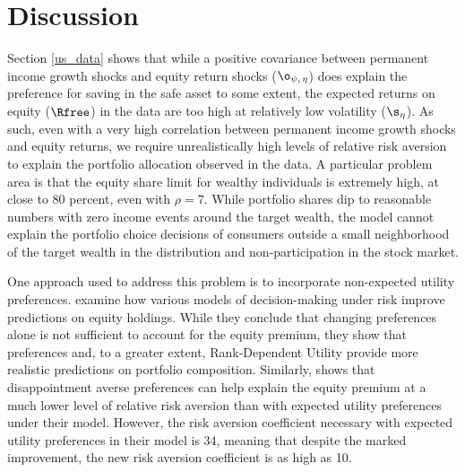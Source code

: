 \section{Discussion}\label{discussion}


Section \ref{us_data} shows that while a positive covariance between permanent income growth shocks and equity return shocks ($\o_{\psi,\,\eta}$) does explain the preference for saving in the safe asset to some extent, the expected returns on equity ($\Rfree$) in the data are too high at relatively low volatility ($\s_{\eta}$). As such, even with a very high correlation between permanent income growth shocks and equity returns, we require unrealistically high levels of relative risk aversion to explain the portfolio allocation observed in the data. A particular problem area is that the equity share limit for wealthy individuals is extremely high, at close to 80 percent, even with $\rho = 7$. While portfolio shares dip to reasonable numbers with zero income events around the target wealth, the model cannot explain the portfolio choice decisions of consumers outside a small neighborhood of the target wealth in the distribution and non-participation in the stock market.

One approach used to address this problem is to incorporate non-expected utility preferences. \citet{Haliassos2001} examine how various models of decision-making under risk improve predictions on equity holdings. While they conclude that changing preferences alone is not sufficient to account for the equity premium, they show that \citet{Kreps1978} preferences and, to a greater extent, Rank-Dependent Utility \citep{Quiggin1982} provide more realistic predictions on portfolio composition. Similarly, \citet{Schreindorfer2020} shows that disappointment averse preferences \citep{Gul1991, Routledge2010} can help explain the equity premium at a much lower level of relative risk aversion than with expected utility preferences under their model. However, the risk aversion coefficient necessary with expected utility preferences in their model is 34, meaning that despite the marked improvement, the new risk aversion coefficient is as high as 10.

